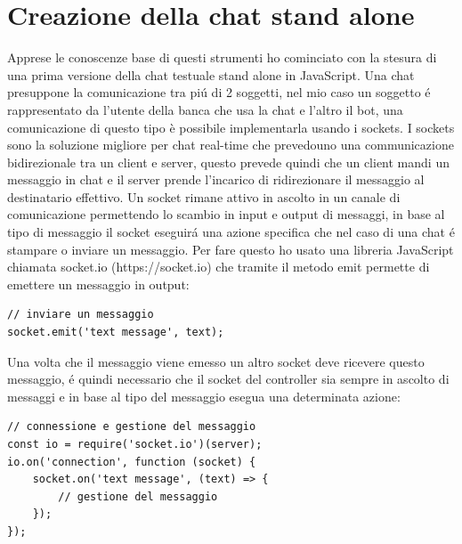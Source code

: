 \section{Creazione della chat stand alone}
Apprese le conoscenze base di questi strumenti ho cominciato con la stesura di una prima versione della chat testuale stand alone in JavaScript. Una chat presuppone la comunicazione tra pi\'u di 2 soggetti, nel mio caso un soggetto \'e rappresentato da l'utente della banca che usa la chat e l'altro il bot, una comunicazione di questo tipo è possibile implementarla usando i sockets.
I sockets sono la soluzione migliore per chat real-time che prevedouno una communicazione bidirezionale tra un client e server, questo prevede quindi che un client mandi un messaggio in chat e il server prende l'incarico di ridirezionare il messaggio al destinatario effettivo. Un socket rimane attivo in ascolto in un canale di comunicazione permettendo lo scambio in input e output di messaggi, in base al tipo di messaggio il socket eseguir\'a una azione specifica che nel caso di una chat \'e stampare o inviare un messaggio. Per fare questo ho usato una libreria JavaScript chiamata socket.io (https://socket.io) che tramite il metodo emit permette di emettere un messaggio in output:
\begin{lstlisting}
// inviare un messaggio
socket.emit('text message', text);
\end{lstlisting} 
Una volta che il messaggio viene emesso un altro socket deve ricevere questo messaggio, \'e quindi necessario che il socket del controller sia sempre in ascolto di messaggi e in base al tipo del messaggio esegua una determinata azione:
\begin{lstlisting}
// connessione e gestione del messaggio
const io = require('socket.io')(server);
io.on('connection', function (socket) {
    socket.on('text message', (text) => {
        // gestione del messaggio
    });
});
\end{lstlisting}
